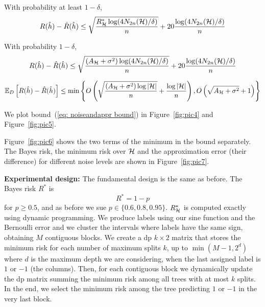 \documentclass[reqno]{amsart}
\begin{document}
\begin{corollary}\label{coroll: bound bestrisk}
    With probability at least $1-\delta$,
    \[
    R(\hat h) - \hat R(\hat h) \le \sqrt{\frac{R^*_{\mathcal{H}}\log(4N_{2n}(\mathcal{H})/\delta)}{n}} + 20\frac{\log(4N_{2n}(\mathcal{H})/\delta)}{n}
    \]
\end{corollary}

\begin{corollary}\label{coroll: bound noiseandappr}
With probability $1-\delta$,
\[
    R(\hat h) - \hat R(\hat h) \le \sqrt{\frac{(A_{\mathcal{H}} + \sigma^2)\log(4N_{2n}(\mathcal{H})/\delta)}{n}} + 20\frac{\log(4N_{2n}(\mathcal{H})/\delta)}{n}
\]
\end{corollary}

\begin{theorem}\label{thm: bound noiseandappr}
  \begin{equation}\label{eq: noiseandappr bound}
\mathbb{E}_D\left[R(\hat h)-\hat R(\hat h)\right] \le \min\left\{ O\left(
\sqrt{\frac{(A_{\mathcal H}+\sigma^2)\log \vert\mathcal{H}\vert}{n}} + \frac{\log\vert\mathcal{H}\vert}{n} \right), O\left(
\sqrt{A_{\mathcal H}+\sigma^2}+1  \right)\right\}
\end{equation}
\end{theorem}

We plot bound~(\ref{eq: noiseandappr bound}) in Figure~\ref{fig:pic4} and Figure~\ref{fig:pic5}. 

Figure~\ref{fig:pic6} shows the two terms of the minimum in the bound separately. The Bayes risk, the minimum risk over $\mathcal{H}$ and the approximation error (their difference) for different noise levels are shown in Figure~\ref{fig:pic7}. 

{\bf Experimental design:} The fundamental design is the same as before. The Bayes risk $R^*$ is 
\[
R^* = 1-p
\]
for $p\ge 0.5$, and as before we sue $p\in\{0.6,0.8,0.95\}$. $R^*_{\mathcal{H}}$ is computed exactly using dynamic programming. We produce labels using our sine function and the Bernoulli error and we cluster the intervals where labels have the same sign, obtaining $M$ contiguous blocks. We create a dp $k\times 2$ matrix that stores the minimum risk for each number of maximum splits $k$, up to $\min(M-1, 2^d)$ where $d$ is the maximum depth we are considering, when the last assigned label is $1$ or $-1$ (the columns). Then, for each contiguous block we dynamically update the dp matrix summing the minimum risk among all trees with at most $k$ splits. In the end, we select the minimum risk among the tree predicting $1$ or $-1$ in the very last block. 
\end{document}
